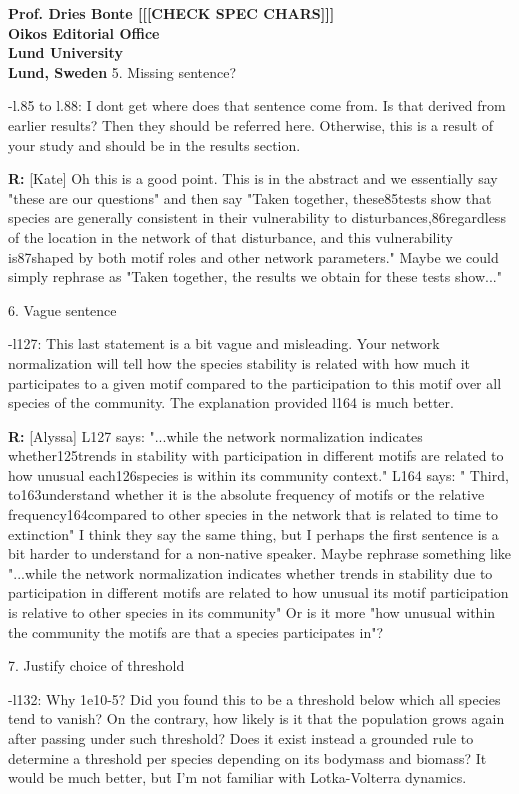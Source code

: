 \documentclass[12pt]{letter}
\begin{document}
\begin{letter}{\bf Prof. Dries Bonte [[[CHECK SPEC CHARS]]]\\
Oikos Editorial Office \\
Lund University \\
Lund, Sweden}
    5. Missing sentence?

      -l.85 to l.88: I dont get where does that sentence come from. Is that derived from earlier results? Then they should be referred here. Otherwise, this is a result of your study and should be in the results section.

      \textbf{R:} [Kate]
      Oh this is a good point. This is in the abstract and we essentially say "these are our questions" and then say "Taken together, these85tests show that species are generally consistent in their vulnerability to disturbances,86regardless of the location in the network of that disturbance, and this vulnerability is87shaped by both motif roles and other network parameters." Maybe we could simply rephrase as "Taken together, the results we obtain for these tests show..."


    6. Vague sentence

      -l127: This last statement is a bit vague and misleading. Your network normalization will tell how the species stability is related with how much it participates to a given motif compared to the participation to this motif over all species of the community. The explanation provided l164 is much better.

      \textbf{R:} [Alyssa]
      L127 says: "...while the network normalization indicates whether125trends in stability with participation in different motifs are related to how unusual each126species is within its community context." L164 says: " Third, to163understand whether it is the absolute frequency of motifs or the relative frequency164compared to other species in the network that is related to time to extinction" I think they say the same thing, but I perhaps the first sentence is a bit harder to understand for a non-native speaker. Maybe rephrase something like "...while the network normalization indicates whether trends in stability due to participation in different motifs are related to how unusual its motif participation is relative to other species in its community" Or is it more "how unusual within the community the motifs are that a species participates in"?


    7. Justify choice of threshold

      -l132: Why 1e10-5? Did you found this to be a threshold below which all species tend to vanish? On the contrary, how likely is it that the population grows again after passing under such threshold? Does it exist instead a grounded rule to determine a threshold per species depending on its bodymass and biomass? It would be much better, but I’m not familiar with Lotka-Volterra dynamics.


\end{letter}
\end{document}

